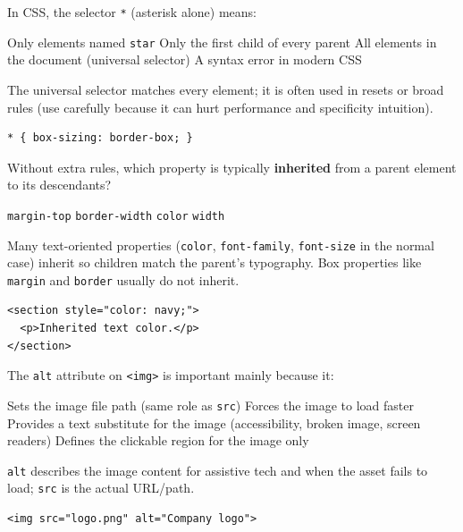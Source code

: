 \question[4]
In CSS, the selector \texttt{*} (asterisk alone) means:
\begin{choices}
  \choice Only elements named \texttt{star}
  \choice Only the first child of every parent
  \CorrectChoice All elements in the document (universal selector)
  \choice A syntax error in modern CSS
\end{choices}
\begin{solution}
  The universal selector matches every element; it is often used in resets or broad rules (use carefully because it can hurt performance and specificity intuition).
\begin{lstlisting}[style=cssexam]
* { box-sizing: border-box; }
\end{lstlisting}
\end{solution}

\question[4]
Without extra rules, which property is typically \textbf{inherited} from a parent element to its descendants?
\begin{choices}
  \choice \texttt{margin-top}
  \choice \texttt{border-width}
  \CorrectChoice \texttt{color}
  \choice \texttt{width}
\end{choices}
\begin{solution}
  Many text-oriented properties (\texttt{color}, \texttt{font-family}, \texttt{font-size} in the normal case) inherit so children match the parent's typography. Box properties like \texttt{margin} and \texttt{border} usually do not inherit.
\begin{lstlisting}[style=htmlexam]
<section style="color: navy;">
  <p>Inherited text color.</p>
</section>
\end{lstlisting}
\end{solution}

\newpage

\question[4]
The \texttt{alt} attribute on \texttt{<img>} is important mainly because it:
\begin{choices}
  \choice Sets the image file path (same role as \texttt{src})
  \choice Forces the image to load faster
  \CorrectChoice Provides a text substitute for the image (accessibility, broken image, screen readers)
  \choice Defines the clickable region for the image only
\end{choices}
\begin{solution}
  \texttt{alt} describes the image content for assistive tech and when the asset fails to load; \texttt{src} is the actual URL/path.
\begin{lstlisting}[style=htmlexam]
<img src="logo.png" alt="Company logo">
\end{lstlisting}
\end{solution}


